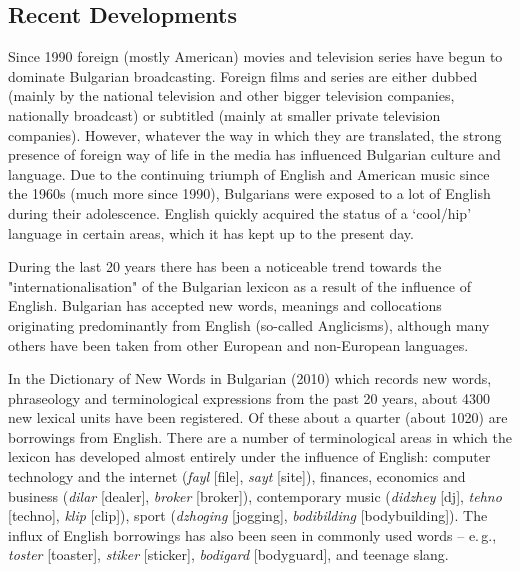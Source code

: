 \documentclass[]{../../metanetpaper}
\begin{document}
\begin{multicols}{2}
\subsection{Recent Developments}

Since 1990 foreign (mostly American) movies and television series have begun to dominate Bulgarian broadcasting. Foreign films and series are either dubbed (mainly by the national television and other bigger television companies, nationally broadcast) or subtitled (mainly at smaller private television companies). However, whatever the way in which they are translated, the strong presence of foreign way of life in the media has influenced Bulgarian culture and language. Due to the continuing triumph of English and American music since the 1960s (much more since 1990), Bulgarians were exposed to a lot of English during their adolescence. English quickly acquired the status of a ‘cool/hip’ language in certain areas, which it has kept up to the present day. 

During the last 20 years there has been a noticeable trend towards the "internationalisation" of the Bulgarian lexicon as a result of the influence of English. Bulgarian has accepted new words, meanings and collocations originating predominantly from English (so-called Anglicisms), although many others have been taken from other European and non-European languages.


In the Dictionary of New Words in Bulgarian (2010)  \cite{NWDict} which records new words, phraseology and terminological expressions from the past 20 years, about 4300 new lexical units have been registered. Of these about a quarter (about 1020) are borrowings from English. There are a number of terminological areas in which the lexicon has developed almost entirely under the influence of English: computer technology and the internet (\textit{{fayl}} [file], \textit{{sayt}} [site]), finances, economics and business (\textit{{dilar}} [dealer], \textit{{broker}} [broker]), contemporary music (\textit{{didzhey}} [dj], \textit{{tehno}} [techno], \textit{{klip}} [clip]), sport (\textit{{dzhoging}} [jogging], \textit{{bodibilding}} [bodybuilding]). The influx of English borrowings has also been seen in commonly used words -- e.\,g., \textit{{toster}} [toaster], \textit{{stiker}} [sticker], \textit{{bodigard}} [bodyguard], and teenage slang.


\end{multicols}
\end{document}
